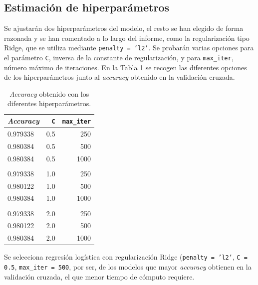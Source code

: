 \documentclass[a4paper, 20pt]{article}
\begin{document}
{%
\subsection{Estimación de hiperparámetros}

Se ajustarán dos hiperparámetros del modelo, el resto se han elegido de forma razonada y se han comentado a lo largo del informe, como la regularización tipo Ridge, que se utiliza mediante \texttt{penalty = 'l2'}. Se probarán varias opciones para el parámetro \texttt{C}, inversa de la constante de regularización, y para \texttt{max\_iter}, número máximo de iteraciones. En la Tabla \ref{tab:lr} se recogen las diferentes opciones de los hiperparámetros junto al \textit{accuracy} obtenido en la validación cruzada.

\begin{table}[H]
\large
\centering
\caption{\textit{Accuracy} obtenido con los diferentes hiperparámetros.}
\label{tab:lr}
\begin{tabular}{lrr}
\toprule
\textit{Accuracy} & \texttt{C} & \texttt{max\_iter}\\ \midrule
0.979338 & 0.5 & 250\\
0.980384 & 0.5 & 500\\
0.980384 & 0.5 & 1000\\ \\[-10pt]
0.979338 & 1.0 & 250\\
0.980122 & 1.0 & 500\\
0.980384 & 1.0 & 1000\\ \\[-10pt]
0.979338 & 2.0 & 250\\
0.980122 & 2.0 & 500\\
0.980384 & 2.0 & 1000\\
\bottomrule
\end{tabular}
\end{table}

Se selecciona regresión logística con regularización Ridge (\texttt{penalty = 'l2'}, \texttt{C = 0.5}, \texttt{max\_iter = 500}, por ser, de los modelos que mayor \textit{accuracy} obtienen en la validación cruzada, el que menor tiempo de cómputo requiere.

}
\end{document}
